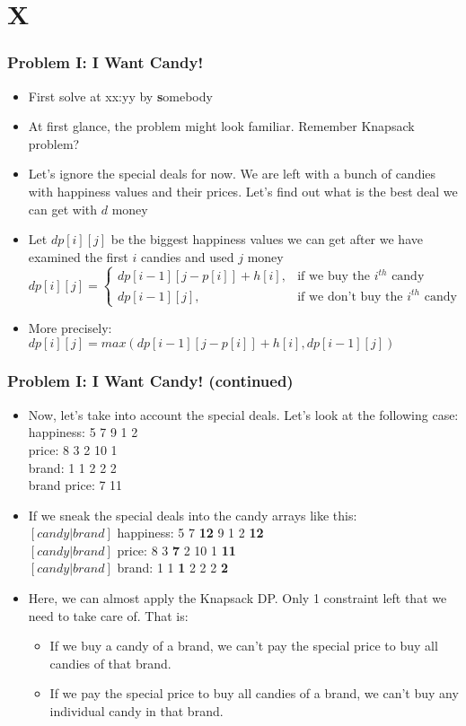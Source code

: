 \section{X}%
\label{sec:X}

\begin{frame}
  \frametitle{Problem I: I Want Candy!}
  \begin{itemize}
    \item First solve at xx:yy by \textbf somebody
    \item At first glance, the problem might look familiar. Remember Knapsack problem?
    \item Let's ignore the special deals for now. We are left with a bunch of candies with happiness values and their prices. Let's find out what is the best deal we can get with $d$ money
    \item Let $dp[i][j]$ be the biggest happiness values we can get after we have examined the first $i$ candies and used $j$ money
    \[ dp[i][j] = \begin{cases} dp[i-1][j-p[i]] + h[i], & \text{if we buy the $i^{th}$ candy}\\ dp[i-1][j], & \text{if we don't buy the $i^{th}$ candy} \end{cases}\]
    \item More precisely: $dp[i][j] = max(dp[i-1][j-p[i]]+h[i],dp[i-1][j])$
  \end{itemize}
\end{frame}

\begin{frame}
  \frametitle{Problem I: I Want Candy! (continued)}
   \begin{itemize}
    \item Now, let's take into account the special deals. Let's look at the following case:\\
        happiness: 5 7 9 1 2\\
        price: 8 3 2 10 1\\
        brand: 1 1 2 2 2\\
        brand price: 7 11\\
    \item If we sneak the special deals into the candy arrays like this:\\
        $[candy|brand]$ happiness: 5 7 \textbf{12} 9 1 2 \textbf{12}\\
        $[candy|brand]$ price: 8 3 \textbf{7} 2 10 1 \textbf{11}\\
        $[candy|brand]$ brand: 1 1 \textbf{1} 2 2 2 \textbf{2}\\
    \item Here, we can almost apply the Knapsack DP. Only 1 constraint left that we need to take care of. That is:
    \begin{itemize}
        \item If we buy a candy of a brand, we can't pay the special price to buy all candies of that brand. 
        \item If we pay the special price to buy all candies of a brand, we can't buy any individual candy in that brand.
    \end{itemize}
  \end{itemize}
\end{frame}

